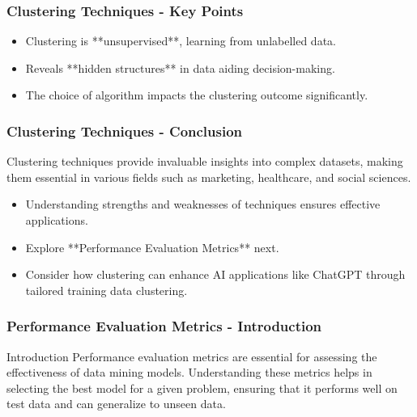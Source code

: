 \documentclass[aspectratio=169]{beamer}
\begin{document}
\begin{frame}[fragile]
    \frametitle{Clustering Techniques - Key Points}
    \begin{itemize}
        \item Clustering is **unsupervised**, learning from unlabelled data.
        \item Reveals **hidden structures** in data aiding decision-making.
        \item The choice of algorithm impacts the clustering outcome significantly.
    \end{itemize}
\end{frame}

\begin{frame}[fragile]
    \frametitle{Clustering Techniques - Conclusion}
    Clustering techniques provide invaluable insights into complex datasets, making them essential in various fields such as marketing, healthcare, and social sciences. 
    \begin{itemize}
        \item Understanding strengths and weaknesses of techniques ensures effective applications.
        \item Explore **Performance Evaluation Metrics** next.
        \item Consider how clustering can enhance AI applications like ChatGPT through tailored training data clustering.
    \end{itemize}
\end{frame}

\begin{frame}[fragile]
    \frametitle{Performance Evaluation Metrics - Introduction}
    \begin{block}{Introduction}
        Performance evaluation metrics are essential for assessing the effectiveness of data mining models. 
        Understanding these metrics helps in selecting the best model for a given problem, ensuring that it performs well on test data and can generalize to unseen data.
    \end{block}
\end{frame}
\end{document}
